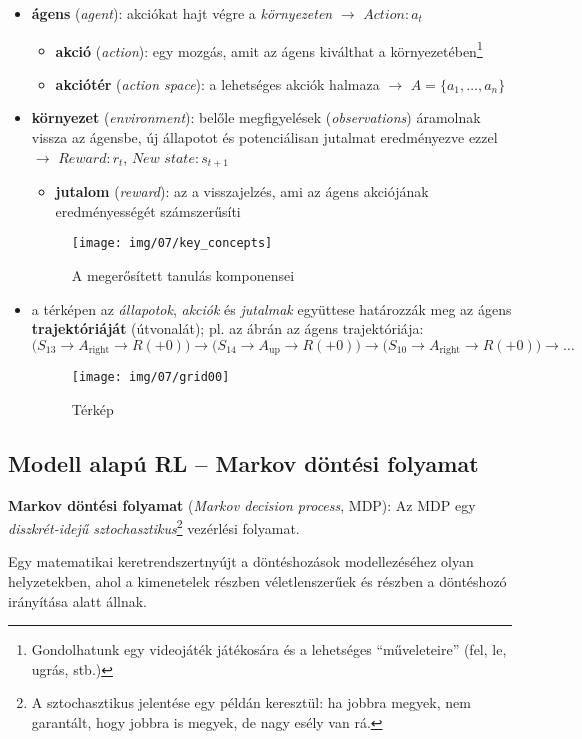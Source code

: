 \documentclass[a4paper, 11pt]{article}
\begin{document}
\begin{itemize}
	\item \textbf{ágens} (\textit{agent}): akciókat hajt végre a \textit{környezeten} $\to$ $Action :a_t$
	\begin{itemize}
		\item \textbf{akció} (\textit{action}): egy mozgás, amit az ágens kiválthat a környezetében\footnote{Gondolhatunk egy videojáték játékosára és a lehetséges ``műveleteire'' (fel, le, ugrás, stb.)}
		\item \textbf{akciótér} (\textit{action space}): a lehetséges akciók halmaza $\to$ $A = \{ a_1, \dots, a_n \}$
	\end{itemize}
	\item \textbf{környezet} (\textit{environment}):  belőle megfigyelések (\textit{observations}) áramolnak vissza az ágensbe, új állapotot és potenciálisan jutalmat eredményezve ezzel $\to$ $Reward: r_t$, $\textit{New state}:s_{t+1}$
	\begin{itemize}
		\item \textbf{jutalom} (\textit{reward}): az a visszajelzés, ami az ágens akciójának eredményességét számszerűsíti
	\end{itemize}
	\begin{figure}[h!]
		\centering
		\texttt{[image: img/07/key\_concepts]}
		\caption{A megerősített tanulás komponensei}
	\end{figure}
	\item a térképen az \textit{állapotok}, \textit{akciók} és \textit{jutalmak} együttese határozzák meg az ágens \textbf{trajektóriáját} (útvonalát);
	pl. az ábrán az ágens trajektóriája: \[ \Big( S_{13} \to A_\text{right} \to R(+0) \Big) \longrightarrow \Big( S_{14} \to A_\text{up} \to R(+0) \Big) \longrightarrow \Big( S_{10} \to A_\text{right} \to R(+0) \Big) \longrightarrow \dots \]
	\begin{figure}[h!]
		\centering
		\texttt{[image: img/07/grid00]}
		\caption{Térkép}
	\end{figure}
\end{itemize}

\subsection{Modell alapú RL -- Markov döntési folyamat}

\begin{tcolorbox}
	\textbf{Markov döntési folyamat} (\textit{Markov decision process}, MDP): Az MDP egy \textit{diszkrét-idejű sztochasztikus}\footnote{A sztochasztikus jelentése egy példán keresztül: ha jobbra megyek, nem garantált, hogy jobbra is megyek, de nagy esély van rá.} vezérlési folyamat. 
	
	Egy matematikai keretrendszertnyújt a döntéshozások modellezéséhez olyan helyzetekben, ahol a kimenetelek részben véletlenszerűek és részben a döntéshozó irányítása alatt állnak.
\end{tcolorbox}
\end{document}
